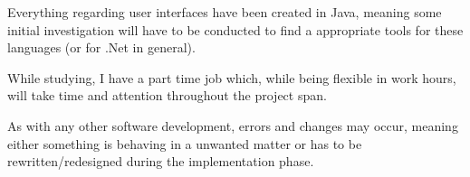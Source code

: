 Everything regarding user interfaces have been created in Java, meaning some initial investigation will have to be conducted to find a appropriate tools for these languages (or for .Net in general).

While studying, I have a part time job which, while being flexible in work hours, will take time and attention throughout the project span.

As with any other software development, errors and changes may occur, meaning either something is behaving in a unwanted matter or has to be rewritten/redesigned during the implementation phase.
